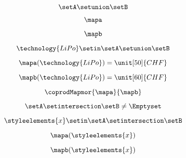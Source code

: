\begin{forslides}
     \begin{equation}
        \label{eq:combination-108}
        \setA\setunion \setB
    \end{equation}
    
    \begin{equation}
        \label{eq:combination-109}
        \mapa
    \end{equation}

    \begin{equation}
        \label{eq:combination-110}
        \mapb
    \end{equation}
       
     \begin{equation}
        \label{eq:combination-111}
        \technology{LiPo}\setin \setA\setunion \setB
    \end{equation}
    
     \begin{equation}
        \label{eq:combination-112}
        \mapa(\technology{LiPo})=\unit[50]{CHF}
    \end{equation}
    
    \begin{equation}
        \label{eq:combination-113}
        \mapb(\technology{LiPo})=\unit[60]{CHF}
    \end{equation}
    
     \begin{equation}
        \label{eq:combination-114}
        \coprodMapmor{\mapa}{\mapb}
    \end{equation}
    
     \begin{equation}
        \label{eq:combination-115}
        \setA\setintersection \setB\neq \Emptyset
    \end{equation}
    
    \begin{equation}
        \label{eq:combination-116}
        \styleelements{x}\setin \setA\setintersection \setB
    \end{equation}
    
     \begin{equation}
        \label{eq:combination-117}
        \mapa(\styleelements{x})
    \end{equation}
    
     \begin{equation}
        \label{eq:combination-118}
        \mapb(\styleelements{x})
    \end{equation}
    

\end{forslides}
